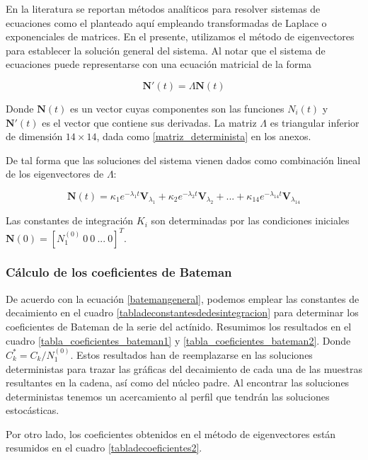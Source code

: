 En la literatura se reportan métodos analíticos para resolver sistemas de ecuaciones como el planteado aquí empleando transformadas de Laplace o exponenciales de matrices. En el presente, utilizamos el método de eigenvectores para establecer la solución general del sistema. Al notar que el sistema de ecuaciones puede representarse con una ecuación matricial de la forma

$$\mathbf{N'}(t)=\Lambda \mathbf{N}(t)$$

Donde $\mathbf{N}(t)$ es un vector cuyas componentes son las funciones $N_i(t)$ y $\mathbf{N'}(t)$ es el vector que contiene sus derivadas. La matriz $\Lambda$ es triangular inferior de dimensión $14\times14$, dada como \ref{matriz_determinista} en los anexos.

De tal forma que las soluciones del sistema vienen dados como combinación lineal de los eigenvectores de $\Lambda$:

$$\mathbf{N}(t)=\kappa_1 e^{-\lambda_1 t} \mathbf{V}_{\lambda_1}+\kappa_2 e^{-\lambda_2 t} \mathbf{V}_{\lambda_2}+...+\kappa_{14} e^{-\lambda_{14} t} \mathbf{V}_{\lambda_{14}}$$

\noindent Las constantes de integración $K_i$ son determinadas por las condiciones iniciales $\mathbf{N}(0)=\left[N_1^{(0)}\ 0\ 0\ ...\ 0\right]^T$.

\subsubsection{Cálculo de los coeficientes de Bateman}

De acuerdo con la ecuación \ref{batemangeneral}, podemos emplear las constantes de decaimiento en el cuadro \ref{tabladeconstantesdedesintegracion} para determinar los coeficientes de Bateman de la serie del actínido. Resumimos los resultados en el cuadro \ref{tabla_coeficientes_bateman1} y \ref{tabla_coeficientes_bateman2}. Donde $C_k^*=C_k/N_1^{(0)}$. Estos resultados han de reemplazarse en las soluciones deterministas para trazar las gráficas del decaimiento de cada una de las muestras resultantes en la cadena, así como del núcleo padre. Al encontrar las soluciones deterministas tenemos un acercamiento al perfil que tendrán las soluciones estocásticas. 

Por otro lado, los coeficientes obtenidos en el método de eigenvectores están resumidos en el cuadro \ref{tabladecoeficientes2}. 


